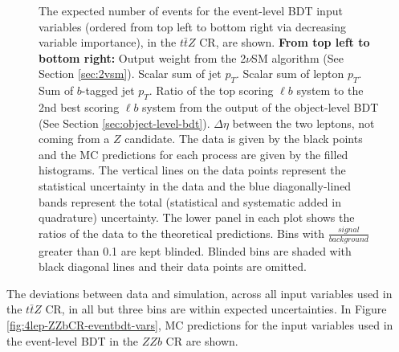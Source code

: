 \begin{figure}[htbp]
\caption{The expected number of events for the event-level BDT input variables (ordered from top left to bottom right via decreasing variable importance), in the $t\bar{t}Z$ CR, are shown. \textbf{From top left to bottom right:} Output weight from the 2$\nu$SM algorithm (See Section \ref{sec:2vsm}). Scalar sum of jet $p_{T}$. Scalar sum of lepton $p_{T}$. Sum of $b$-tagged jet $p_{T}$. Ratio of the top scoring $\ell b$ system to the 2nd best scoring $\ell b$ system from the output of the object-level BDT (See Section \ref{sec:object-level-bdt}). $\Delta \eta$ between the two leptons, not coming from a $Z$ candidate. The data is given by the black points and the MC predictions for each process are given by the filled histograms. The vertical lines on the data points represent the statistical uncertainty in the data and the blue diagonally-lined bands represent the total (statistical and systematic added in quadrature) uncertainty. The lower panel in each plot shows the ratios of the data to the theoretical predictions. Bins with $\frac{signal}{background}$ greater than 0.1 are kept blinded. Blinded bins are shaded with black diagonal lines and their data points are omitted.}
  \label{fig:4lep-ttZCR-eventbdt-vars}
\end{figure}
The deviations between data and simulation, across all input variables used in the $t\bar{t}Z$ CR, in all but three bins are within expected uncertainties. In Figure \ref{fig:4lep-ZZbCR-eventbdt-vars}, MC predictions for the input variables used in the event-level BDT in the $ZZb$ CR are shown.
